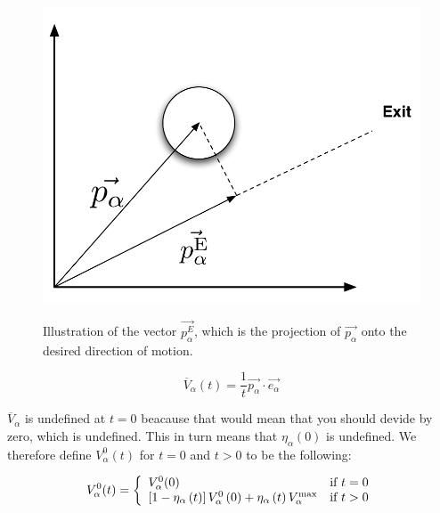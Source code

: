 \begin{figure}[ht]
    \centering
    {\includegraphics[scale=0.35]{Figures/NotationOfAgent2.pdf}} 
    \caption{Illustration of the vector $ \vec{p_{\alpha}^{E}}$, which is the projection of $ \vec{p_{\alpha}} $ onto the desired direction of motion.}
    \label{impatience}
\end{figure}

\begin{equation}\label{averagespeed}
   \overline{V}_{\alpha} \left( t \right) =
   \frac{1}{t} \overrightarrow{p_{\alpha}}\cdot \overrightarrow{e_{\alpha}} 
\end{equation}

$\overline{V}_{\alpha}$ is undefined at $t=0$ beacause that would mean 
that you should devide by zero, which is undefined. This in turn means 
that $\eta_{\alpha}(0)$ is undefined. We therefore define 
$V_{\alpha}^{0}(t)$ for $t=0$ and $t>0$ to be the following:

\begin{equation}\label{eqn:cond-define}
  V_{\alpha}^{0} (t) = \left\{ 
  \begin{array}{l l}
    V_\alpha^0(0) & \text{if $t=0$}\\
    \left[ 1 - \eta_{\alpha} \left( t \right) \right] 
    V_{\alpha}^{0} \left( 0 \right) +
    \eta_{\alpha} \left( t \right)V_{\alpha}^{\text{max}} & \text{if 
    $t > 0$}\\
  \end{array} \right.
\end{equation}

